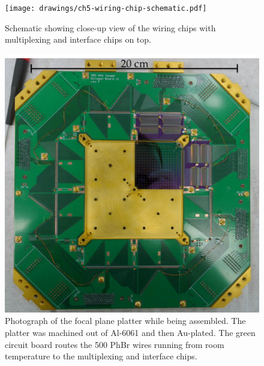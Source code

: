 \begin{figure}
\centering
\texttt{[image: drawings/ch5-wiring-chip-schematic.pdf]}
\caption[Wiring chip schematic]{
  Schematic showing close-up view of the wiring chips with multiplexing and interface chips on top.
}
\label{fig:ch5-wiring-chip-schematic}
\end{figure}

\begin{figure}
\centering
\includegraphics[width=6.00in]{images/ch5-focal-plane-platter.jpg}
\caption[Focal plane during assembly]{
  Photograph of the focal plane platter while being assembled.
  The platter was machined out of Al-6061 and then Au-plated.
  The green circuit board routes the 500 PhBr wires running from room temperature to the multiplexing and interface chips.
}
\label{fig:ch5-focal-plane-platter}
\end{figure}
